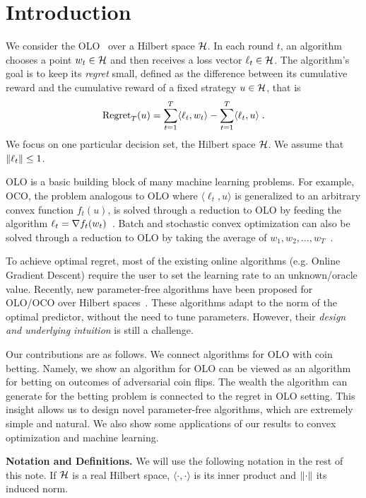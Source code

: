 \section{Introduction}
\label{section:introduction}

We consider the \ac{OLO}~\citep{Cesa-Bianchi-Lugosi-2006, Shalev-Shwartz-2011}
over a Hilbert space $\mathcal{H}$. In each round $t$, an algorithm chooses a point $w_t
\in \mathcal{H}$ and then receives a loss vector $\ell_t \in \mathcal{H}$. The algorithm's goal is
to keep its \emph{regret} small, defined as the difference between its
cumulative reward and the cumulative reward of a fixed strategy $u \in \mathcal{H}$,
that is
\[
\operatorname{Regret}_T(u) = \sum_{t=1}^T \langle \ell_t, w_t \rangle - \sum_{t=1}^T \langle \ell_t, u \rangle  \; .
\]
We focus on one particular decision set, the Hilbert space $\mathcal{H}$.  We assume
that $\left\|{\ell_t}\right\| \le 1$.

\ac{OLO} is a basic building block of many machine learning problems. For
example, \ac{OCO}, the problem analogous to \ac{OLO} where $\langle \ell_t, u
\rangle$ is generalized to an arbitrary convex function $f_t(u)$, is solved
through a reduction to \ac{OLO} by feeding the algorithm $\ell_t = \nabla
f_t(w_t)$~\citep{Shalev-Shwartz-2011}.  Batch and stochastic convex
optimization can also be solved through a reduction to \ac{OLO} by
taking the average of $w_1, w_2, \dots, w_T$~\citep{Shalev-Shwartz-2011}.

To achieve optimal regret, most of the existing online algorithms (e.g.  Online
Gradient Descent) require the user to set the learning rate to an
unknown/oracle value. Recently, new parameter-free algorithms have been
proposed for \ac{OLO}/\ac{OCO} over Hilbert
spaces~\citep{Streeter-McMahan-2012, Orabona-2013, McMahan-Abernethy-2013,
McMahan-Orabona-2014, Orabona-2014}.  These algorithms adapt to the norm of the
optimal predictor, without the need to tune parameters. However, their
\emph{design and underlying intuition} is still a challenge.

Our contributions are as follows. We connect algorithms for \ac{OLO} with coin
betting. Namely, we show an algorithm for \ac{OLO} can be viewed as an
algorithm for betting on outcomes of adversarial coin flips. The wealth the
algorithm can generate for the betting problem is connected to the regret in
\ac{OLO} setting. This insight allows us to design novel parameter-free
algorithms, which are extremely simple and natural. We also show some
applications of our results to convex optimization and machine learning.

\noindent\textbf{Notation and Definitions.}
We will use the following notation in the rest of this note.  If $\mathcal{H}$ is a real
Hilbert space, $\langle \cdot, \cdot \rangle$ is its inner product and
$\left\|{\cdot}\right\|$ its induced norm.
